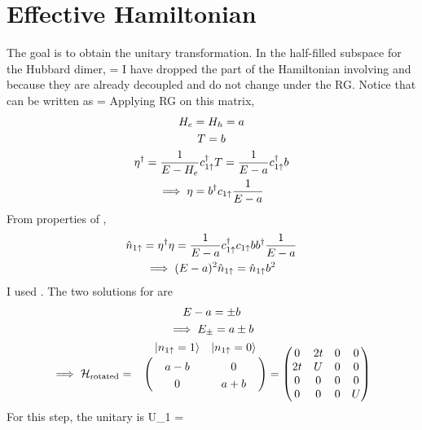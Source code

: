 \documentclass[12pt]{article}
\begin{document}
\section{Effective Hamiltonian}
The goal is to obtain the unitary transformation. In the half-filled subspace for the Hubbard dimer,
\beq
\ham = 
\eeq
I have dropped the part of the Hamiltonian involving \il{\ket{\ua,\ua}} and \il{\ket{\da,\da}} because they are already decoupled and do not change under the RG. Notice that \il{\ham} can be written as 
\beq
	\ham = 
\eeq
Applying RG on this matrix,
\begin{gather}
H_e = H_h = a \\
T = b\\
\eta^\dagger = \frac{1}{E - H_e}c^\dagger_{1\uparrow} T = \frac{1}{E - a}c^\dagger_{1\uparrow}b\\
\implies \eta  = b^\dagger c_{1\uparrow}\frac{1}{E - a}
\end{gather}
From properties of \il{\eta},
\begin{gather}
\hat n_{1\uparrow} = \eta^\dagger \eta = \frac{1}{E-a}c^\dagger_{1\uparrow}c_{1\uparrow}bb^\dagger\frac{1}{E-a} \\
\implies(E-a)^2 \hat n_{1\uparrow} = \hat n_{1\uparrow}b^2
\end{gather}
I used . The two solutions for  are
\begin{gather}
E -a = \pm b \\
\implies E_\pm = a \pm b\\
\implies \ham_\text{rotated} = \bordermatrix{~ & \ket{n_{1\ua} = 1} & \ket{n_{1\ua}=0} \cr
		& a-b & 0 \cr
		& 0 & a+b \cr}
		=\begin{pmatrix}
		  0 & 2t & 0 & 0 \\
		  2t & U & 0 & 0 \\
		  0 & 0 & 0 & 0 \\
		  0 & 0 & 0 & U
	  \end{pmatrix}
\end{gather}
For this step, the unitary is
\beq
U_1 =  
\end{document}
